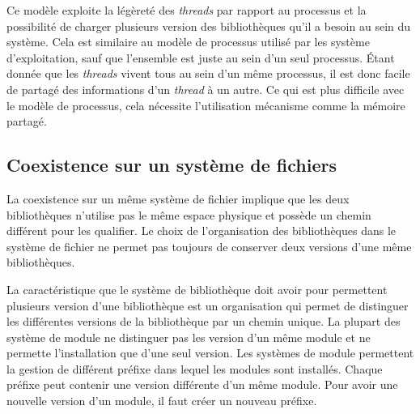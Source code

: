 Ce modèle exploite la légèreté des \textit{threads} par rapport au processus et
la possibilité de charger plusieurs version des bibliothèques qu'il a besoin au sein
du système. Cela est similaire au modèle de processus utilisé par les
système d'exploitation, sauf que l'ensemble est juste au sein d'un seul processus.
Étant donnée que les \textit{threads} vivent tous au sein d'un même processus,
il est donc facile de partagé des informations d'un \textit{thread} à un autre.
Ce qui est plus difficile avec le modèle de processus, cela nécessite l'utilisation
mécanisme comme la mémoire partagé.





\subsection{Coexistence sur un système de fichiers}
La coexistence sur un même système de fichier implique que les deux
bibliothèques n'utilise pas le même espace physique et possède un chemin
différent pour les qualifier. Le choix de l'organisation des bibliothèques
dans le système de fichier ne permet pas toujours de conserver deux versions
d'une même bibliothèques.

La caractéristique que le système de bibliothèque doit avoir pour permettent
plusieurs version d'une bibliothèque est un organisation qui permet de distinguer
les différentes versions de la bibliothèque par un chemin unique.
La plupart des système de module ne distinguer pas les version d'un même module
et ne permette l'installation que d'une seul version. Les systèmes de module permettent
la gestion de différent préfixe dans lequel les modules sont installés. Chaque préfixe peut
contenir une version différente d'un même module. Pour avoir une nouvelle version d'un module,
il faut créer un nouveau préfixe.





